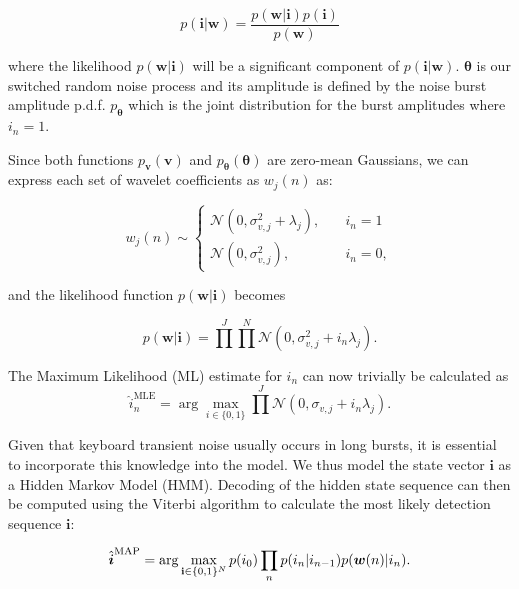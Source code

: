 \begin{equation}\label{eq:Bayes}
p(\boldsymbol{i}|\boldsymbol{w}) = \frac{p(\boldsymbol{w}|\boldsymbol{i})p(\boldsymbol{i})}{p(\boldsymbol{w})}
\end{equation}

where the likelihood $p(\boldsymbol{w}|\boldsymbol{i})$ will be a significant component of $p(\boldsymbol{i}|\boldsymbol{w})$.
$\boldsymbol{\theta}$ is our switched random noise process and its amplitude is defined by the noise burst amplitude p.d.f. $p_{\boldsymbol{\theta}}$ which is the joint distribution for the burst amplitudes where $i_{n} = 1$.

Since both functions $p_{\boldsymbol{v}}(\boldsymbol{v})$ and $p_{\boldsymbol{\theta}}(\boldsymbol{\theta})$ are zero-mean Gaussians, we can express each set of wavelet coefficients as $w_j(n)$ as:

\begin{equation}\label{eq:cases}
  w_j(n) \sim
  \begin{cases}
    \mathcal{N}(0,\sigma_{v,j}^2 + \lambda_j), & \quad i_n = 1\\
   \mathcal{N}(0,\sigma_{v,j}^2), & \quad i_n = 0,
  \end{cases}
\end{equation}

and the likelihood function $p(\boldsymbol{w}|\boldsymbol{i})$ becomes

\begin{equation}\label{eq:likelihood1}
p(\boldsymbol{w}|\boldsymbol{i}) = \prod^J \prod^N \mathcal{N}(0,\sigma_{v,j}^2 + i_n\lambda_j).
\end{equation}

The Maximum Likelihood (ML) estimate for $i_n$ can now trivially be calculated as
\begin{equation}\label{eq:ml1}
\hat{i}_n^{\textrm{MLE}} = \arg\max_{i\in\{0,1\}} \prod^J \mathcal{N}(0,\sigma_{v,j} + i_n\lambda_j).
\end{equation}

Given that keyboard transient noise usually occurs in long bursts, it is essential to incorporate this knowledge into the model. We thus model the state vector $\boldsymbol{i}$ as a Hidden Markov Model (HMM). Decoding of the hidden state sequence can then be computed using the Viterbi algorithm\cite{Viterbi1967}\cite{Forney1973} to calculate the most likely detection sequence $\boldsymbol{i}$:

\begin{equation}\label{eq:viterbi}
\hat{\boldsymbol{i}}^{\textrm{MAP}} = \arg\max_{{\bf i}\in\{0,1\}^N} p(i_{0})\prod_n p(i_n | i_{n-1})p(\boldsymbol{w}(n) | i_n).
\end{equation}

